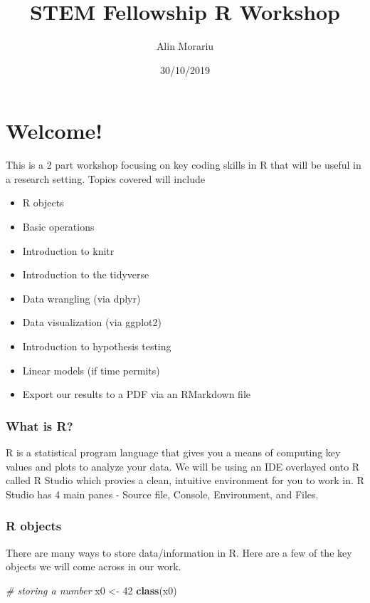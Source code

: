 \documentclass[]{article}
\title{STEM Fellowship R Workshop}
\author{Alin Morariu}
\date{30/10/2019}
\newenvironment{Shaded}{\begin{snugshade}}{\end{snugshade}}
\newcommand{\CommentTok}[1]{\textcolor[rgb]{0.56,0.35,0.01}{\textit{#1}}}
\newcommand{\DecValTok}[1]{\textcolor[rgb]{0.00,0.00,0.81}{#1}}
\newcommand{\KeywordTok}[1]{\textcolor[rgb]{0.13,0.29,0.53}{\textbf{#1}}}
\newcommand{\NormalTok}[1]{#1}
\newcommand{\StringTok}[1]{\textcolor[rgb]{0.31,0.60,0.02}{#1}}
\providecommand{\tightlist}{%
  \setlength{\itemsep}{0pt}\setlength{\parskip}{0pt}}
\begin{document}
\maketitle

\hypertarget{welcome}{%
\section{Welcome!}\label{welcome}}

This is a 2 part workshop focusing on key coding skills in R that will
be useful in a research setting. Topics covered will include

\begin{itemize}
\tightlist
\item
  R objects
\item
  Basic operations
\item
  Introduction to knitr
\item
  Introduction to the tidyverse
\item
  Data wrangling (via dplyr)
\item
  Data visualization (via ggplot2)
\item
  Introduction to hypothesis testing
\item
  Linear models (if time permits)
\item
  Export our results to a PDF via an RMarkdown file
\end{itemize}

\hypertarget{what-is-r}{%
\subsubsection{What is R?}\label{what-is-r}}

R is a statistical program language that gives you a means of computing
key values and plots to analyze your data. We will be using an IDE
overlayed onto R called R Studio which provies a clean, intuitive
environment for you to work in. R Studio has 4 main panes - Source file,
Console, Environment, and Files.

\hypertarget{r-objects}{%
\subsubsection{R objects}\label{r-objects}}

There are many ways to store data/information in R. Here are a few of
the key objects we will come across in our work.

\begin{Shaded}
\begin{Highlighting}[]
\CommentTok{# storing a number }
\NormalTok{x0 <-}\StringTok{ }\DecValTok{42} 
\KeywordTok{class}\NormalTok{(x0)}
\end{Highlighting}
\end{Shaded}
\end{document}
